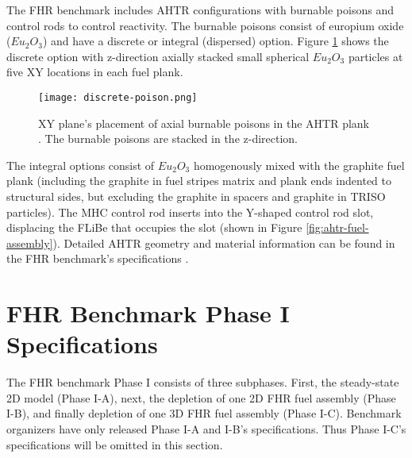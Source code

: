 The \gls{FHR} benchmark includes \gls{AHTR} configurations with burnable poisons 
and control rods to control reactivity. 
The burnable poisons consist of europium oxide ($Eu_2O_3$) and have a discrete
or integral (dispersed) option. 
Figure \ref{fig:discrete-poison} shows the discrete option with z-direction axially 
stacked small spherical $Eu_2O_3$ particles at five XY locations in each 
fuel plank. 
\begin{figure}[htbp]
    \centering
    \texttt{[image: discrete-poison.png]}
    \caption{XY plane's placement of axial burnable poisons in the \acrlong{AHTR} 
    plank \cite{petrovic_benchmark_2021}. The burnable poisons are stacked in 
    the z-direction.}
    \label{fig:discrete-poison}
\end{figure}
The integral options consist of $Eu_2O_3$ homogenously mixed with the graphite 
fuel plank (including the graphite in fuel stripes matrix and plank ends 
indented to structural sides, but excluding the graphite in spacers and 
graphite in TRISO particles).
The \gls{MHC} control rod inserts into the Y-shaped control rod slot, displacing
the \gls{FLiBe} that occupies the slot 
(shown in Figure \ref{fig:ahtr-fuel-assembly}). 
Detailed \gls{AHTR} geometry and material information can be found in the 
\gls{FHR} benchmark's specifications \cite{petrovic_benchmark_2021}.

\section{FHR Benchmark Phase I Specifications}
\label{sec:phase1}
The \gls{FHR} benchmark Phase I consists of three subphases.
First, the steady-state 2D model (Phase I-A), next, the depletion of one 2D \gls{FHR} fuel 
assembly (Phase I-B), and finally depletion of one 3D \gls{FHR} fuel assembly 
(Phase I-C).
Benchmark organizers have only released Phase I-A and I-B's specifications. 
Thus Phase I-C's specifications will be omitted in this section.


